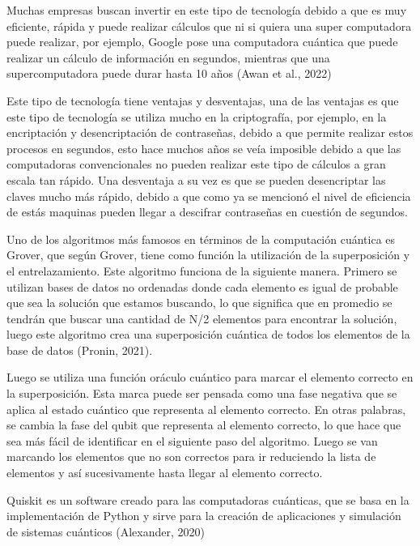 \documentclass{article}
\begin{document}
Muchas empresas buscan invertir en este tipo de tecnología debido a que es muy eficiente, rápida y puede realizar cálculos que ni si quiera una super computadora puede realizar, por ejemplo, Google pose una computadora cuántica que puede realizar un cálculo de información en segundos, mientras que una supercomputadora puede durar hasta 10 años (Awan et al., 2022)

Este tipo de tecnología tiene ventajas y desventajas, una de las ventajas es que este tipo de tecnología se utiliza mucho en la criptografía, por ejemplo, en la encriptación y desencriptación de contraseñas, debido a que permite realizar estos procesos en segundos, esto hace muchos años se veía imposible debido a que las computadoras convencionales no pueden realizar este tipo de cálculos a gran escala tan rápido. Una desventaja a su vez es que se pueden desencriptar las claves mucho más rápido, debido a que como ya se mencionó el nivel de eficiencia de estás maquinas pueden llegar a descifrar contraseñas en cuestión de segundos. 

Uno de los algoritmos más famosos en términos de la computación cuántica es Grover, que según Grover, tiene como función la utilización de la superposición y el entrelazamiento. Este algoritmo funciona de la siguiente manera. Primero se utilizan bases de datos no ordenadas donde cada elemento es igual de probable que sea la solución que estamos buscando, lo que significa que en promedio se tendrán que buscar una cantidad de N/2 elementos para encontrar la solución, luego este algoritmo crea una superposición cuántica de todos los elementos de la base de datos (Pronin, 2021).

Luego se utiliza una función oráculo cuántico para marcar el elemento correcto en la superposición. Esta marca puede ser pensada como una fase negativa que se aplica al estado cuántico que representa al elemento correcto. En otras palabras, se cambia la fase del qubit que representa al elemento correcto, lo que hace que sea más fácil de identificar en el siguiente paso del algoritmo. Luego se van marcando los elementos que no son correctos para ir reduciendo la lista de elementos y así sucesivamente hasta llegar al elemento correcto. 

Quiskit es un software creado para las computadoras cuánticas, que se basa en la implementación de Python y sirve para la creación de aplicaciones y simulación de sistemas cuánticos (Alexander, 2020)
\end{document}

